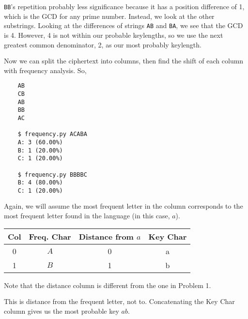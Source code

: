 \documentclass[10pt,letterpaper]{report}
\begin{document}
\begin{enumerate}
	\verb|BB|'s repetition probably less significance because it
	has a position difference of 1, which is the GCD for any prime number. Instead, we
	look at the other substrings.
	Looking at the differences of strings \verb|AB| and \verb|BA|, we see that the GCD is
	4. However, 4 is not within our probable keylengths, so we use the next greatest
	common denominator, 2, as our most probably keylength.
	
	Now we can split the ciphertext into columns, then find the shift of each column with
	frequency analysis.
	So,
	\begin{verbatim}
	AB
	CB
	AB
	BB
	AC
	
	$ frequency.py ACABA
	A: 3 (60.00%)
	B: 1 (20.00%)
	C: 1 (20.00%)
	
	$ frequency.py BBBBC
	B: 4 (80.00%)
	C: 1 (20.00%)
	\end{verbatim}
	
	Again, we will assume the most frequent letter in the column corresponds to 
	the most frequent letter found in the language (in this case, $a$).
	
	\begin{center}
	\begin{tabular}{ | c | c | c | c |}
	\hline
	Col & Freq. Char & Distance from $a$ & Key Char \\ \hline
	0 & $A$ & 0  & a\\
	1 & $B$ & 1 & b\\
	\hline
	\end{tabular}
	
	\end{center}
	Note that the distance column is different from the one in Problem 1.
	\par	
	 This is 
	distance from the frequent letter, not to.
	Concatenating the Key Char column gives us the most probable key $ab$.
	
	
	

\end{enumerate}
\end{document}
